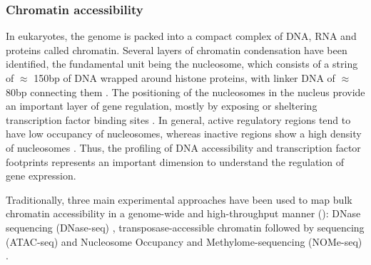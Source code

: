 \subsubsection{Chromatin accessibility} \label{section:chromatin_accessibility}

In eukaryotes, the genome is packed into a compact complex of DNA, RNA and proteins called chromatin. Several layers of chromatin condensation have been identified, the fundamental unit being the nucleosome, which consists of a string of $\approx$  150bp of DNA wrapped around histone proteins, with linker DNA of $\approx$ 80bp connecting them \cite{Klemm2019,Tsompana2014}. The positioning of the nucleosomes in the nucleus provide an important layer of gene regulation, mostly by exposing or sheltering transcription factor binding sites \cite{Jiang2009}. In general, active regulatory regions tend to have low occupancy of nucleosomes, whereas inactive regions show a high density of nucleosomes \cite{Struhl2013}. Thus, the profiling of DNA accessibility and transcription factor footprints represents an important dimension to understand the regulation of gene expression.


Traditionally, three main experimental approaches have been used to map bulk chromatin accessibility in a genome-wide and high-throughput manner \cite{Nordstrom2019} (): DNase sequencing (DNase-seq) \cite{Song2010}, transposase-accessible chromatin followed by sequencing (ATAC-seq) \cite{Buenrostro2013} and Nucleosome Occupancy and Methylome-sequencing (NOMe-seq) \cite{Kelly2012}.

